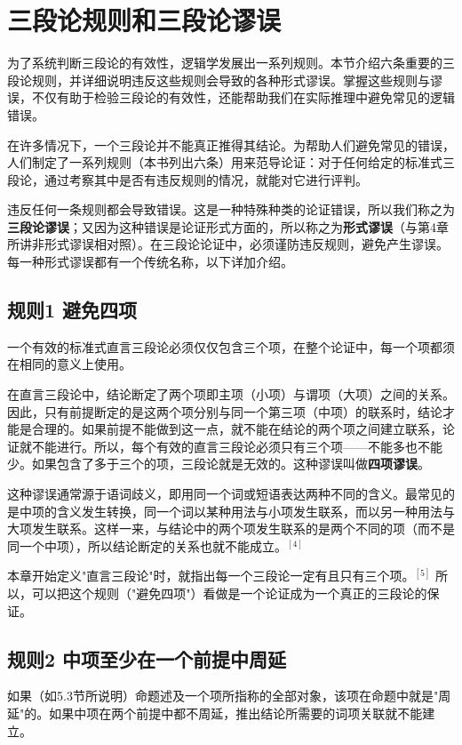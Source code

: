 \section{三段论规则和三段论谬误}

\begin{logicbox}[title=引言]
为了系统判断三段论的有效性，逻辑学发展出一系列规则。本节介绍六条重要的三段论规则，并详细说明违反这些规则会导致的各种形式谬误。掌握这些规则与谬误，不仅有助于检验三段论的有效性，还能帮助我们在实际推理中避免常见的逻辑错误。
\end{logicbox}

在许多情况下，一个三段论并不能真正推得其结论。为帮助人们避免常见的错误，人们制定了一系列规则（本书列出六条）用来范导论证：对于任何给定的标准式三段论，通过考察其中是否有违反规则的情况，就能对它进行评判。

违反任何一条规则都会导致错误。这是一种特殊种类的论证错误，所以我们称之为\textbf{三段论谬误}；又因为这种错误是论证形式方面的，所以称之为\textbf{形式谬误}（与第4章所讲非形式谬误相对照）。在三段论论证中，必须谨防违反规则，避免产生谬误。每一种形式谬误都有一个传统名称，以下详加介绍。

\subsection{规则1 避免四项}
一个有效的标准式直言三段论必须仅仅包含三个项，在整个论证中，每一个项都须在相同的意义上使用。

在直言三段论中，结论断定了两个项即主项（小项）与谓项（大项）之间的关系。因此，只有前提断定的是这两个项分别与同一个第三项（中项）的联系时，结论才能是合理的。如果前提不能做到这一点，就不能在结论的两个项之间建立联系，论证就不能进行。所以，每个有效的直言三段论必须只有三个项——不能多也不能少。如果包含了多于三个的项，三段论就是无效的。这种谬误叫做\textbf{四项谬误}。

这种谬误通常源于语词歧义，即用同一个词或短语表达两种不同的含义。最常见的是中项的含义发生转换，同一个词以某种用法与小项发生联系，而以另一种用法与大项发生联系。这样一来，与结论中的两个项发生联系的是两个不同的项（而不是同一个中项），所以结论断定的关系也就不能成立。$^{[4]}$

本章开始定义"直言三段论"时，就指出每一个三段论一定有且只有三个项。$^{[5]}$ 所以，可以把这个规则（"避免四项"）看做是一个论证成为一个真正的三段论的保证。

\subsection{规则2 中项至少在一个前提中周延}
如果（如5.3节所说明）命题述及一个项所指称的全部对象，该项在命题中就是"周延"的。如果中项在两个前提中都不周延，推出结论所需要的词项关联就不能建立。

